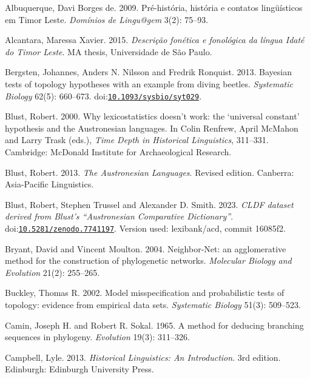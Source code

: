 \documentclass[11pt]{article}
\newcommand{\doi}[1]{doi:\href{https://doi.org/#1}{\nolinkurl{#1}}}
\begin{document}
\begin{thebibliography}{}

Albuquerque, Davi Borges de. 2009. Pré-história, história e contatos lingüísticos em Timor Leste. \emph{Domínios de Lingu@gem} 3(2): 75--93.

Alcantara, Maressa Xavier. 2015. \emph{Descrição fonética e fonológica da língua Idaté do Timor Leste}. MA thesis, Universidade de São Paulo.

Bergsten, Johannes, Anders N. Nilsson and Fredrik Ronquist. 2013. Bayesian tests of topology hypotheses with an example from diving beetles. \emph{Systematic Biology} 62(5): 660--673. \doi{10.1093/sysbio/syt029}.

Blust, Robert. 2000. Why lexicostatistics doesn't work: the `universal constant' hypothesis and the Austronesian languages. In Colin Renfrew, April McMahon and Larry Trask (eds.), \emph{Time Depth in Historical Linguistics}, 311--331. Cambridge: McDonald Institute for Archaeological Research.

Blust, Robert. 2013. \emph{The Austronesian Languages}. Revised edition. Canberra: Asia-Pacific Linguistics.

Blust, Robert, Stephen Trussel and Alexander D. Smith. 2023. \emph{CLDF dataset derived from Blust's ``Austronesian Comparative Dictionary''}. \doi{10.5281/zenodo.7741197}. Version used: lexibank/acd, commit 16085f2.

Bryant, David and Vincent Moulton. 2004. Neighbor-Net: an agglomerative method for the construction of phylogenetic networks. \emph{Molecular Biology and Evolution} 21(2): 255--265.

Buckley, Thomas R. 2002. Model misspecification and probabilistic tests of topology: evidence from empirical data sets. \emph{Systematic Biology} 51(3): 509--523.

Camin, Joseph H. and Robert R. Sokal. 1965. A method for deducing branching sequences in phylogeny. \emph{Evolution} 19(3): 311--326.

Campbell, Lyle. 2013. \emph{Historical Linguistics: An Introduction}. 3rd edition. Edinburgh: Edinburgh University Press.


\end{thebibliography}
\end{document}
